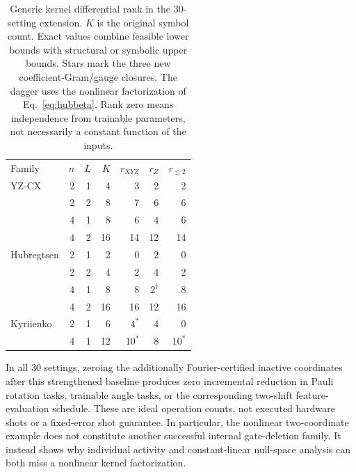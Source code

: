 \begin{table}[htbp]
\caption{Generic kernel differential rank in the 30-setting extension.
$K$ is the original symbol count. Exact values combine feasible
lower bounds with structural or symbolic upper bounds. Stars mark
the three new coefficient-Gram/gauge closures. The dagger
uses the nonlinear factorization of Eq.~\eqref{eq:hubbeta}.
Rank zero means independence from trainable parameters, not necessarily
a constant function of the inputs.}
\label{tab:extension}
\begin{tabular}{lrrrrrr}
\toprule
Family & $n$ & $L$ & $K$ & $r_{XYZ}$ & $r_Z$ & $r_{\le2}$\\
YZ-CX &2&1&4&3&2&2\\
 &2&2&8&7&6&6\\
 &4&1&8&6&4&6\\
 &4&2&16&14&12&14\\
Hubregtsen &2&1&2&0&2&0\\
 &2&2&4&2&4&2\\
 &4&1&8&8&$2^\dagger$&8\\
 &4&2&16&16&12&16\\
Kyriienko &2&1&6&$4^*$&4&0\\
 &4&1&12&$10^*$&8&$10^*$\\
\bottomrule
\end{tabular}
\end{table}

In all 30 settings, zeroing the additionally Fourier-certified
inactive coordinates after this strengthened baseline produces zero
incremental reduction in Pauli rotation tasks, trainable angle tasks,
or the corresponding two-shift feature-evaluation schedule. These are
ideal operation counts, not executed hardware shots or a fixed-error
shot guarantee. In particular, the nonlinear two-coordinate example
does not constitute another successful internal gate-deletion family.
It instead shows why individual activity and constant-linear null-space
analysis can both miss a nonlinear kernel factorization.
